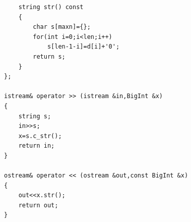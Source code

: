 \begin{verbatim}
    string str() const
    {
        char s[maxn]={};
        for(int i=0;i<len;i++)
            s[len-1-i]=d[i]+'0';
        return s;
    }
};

istream& operator >> (istream &in,BigInt &x)
{
    string s;
    in>>s;
    x=s.c_str();
    return in;
}

ostream& operator << (ostream &out,const BigInt &x)
{
    out<<x.str();
    return out;
}
\end{verbatim}